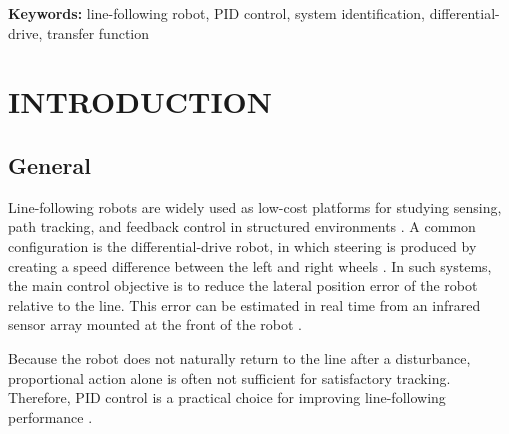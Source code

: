 \documentclass[a4paper,12pt,oneside]{book}
\begin{document}
\textbf{Keywords:} line-following robot, PID control, system identification, differential-drive, transfer function

\newpage
\renewcommand\contentsname{CONTENTS}
\begin{singlespacing}
{\hypersetup{linkcolor=black}
\tableofcontents
}
\end{singlespacing}


\newpage
{} \label{listoffig}
{\hypersetup{linkcolor=black}
\listoffigures
}

\mainmatter
{}
\newpage

\chapter{INTRODUCTION}\label{chap:intro}

\section{General}

Line-following robots are widely used as low-cost platforms for studying sensing,
path tracking, and feedback control in structured environments
\cite{balaji2015}. A common configuration is the differential-drive robot, in
which steering is produced by creating a speed difference between the left and
right wheels \cite{siwek2023}. In such systems, the main control objective is to
reduce the lateral position error of the robot relative to the line. This error
can be estimated in real time from an infrared sensor array mounted at the front
of the robot \cite{baharuddin2006}.

Because the robot does not naturally return to the line after a disturbance,
proportional action alone is often not sufficient for satisfactory tracking.
Therefore, PID control is a practical choice for improving line-following
performance \cite{balaji2015}.
\end{document}
